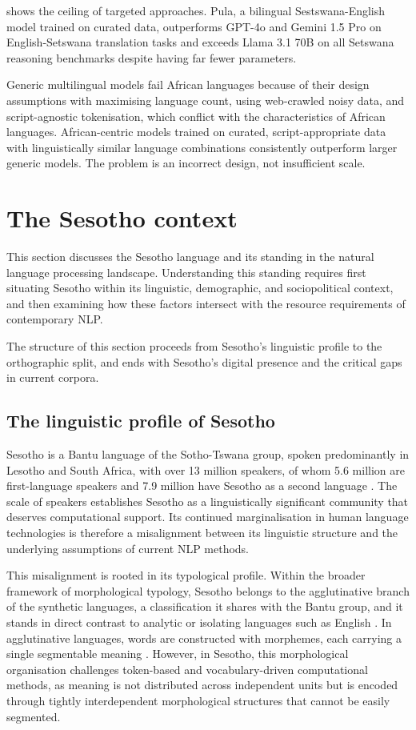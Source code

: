 \documentclass[11pt,a4paper]{article}
\begin{document}
\citet{brown2025pula} shows the ceiling of targeted approaches. Pula, a bilingual Sestswana-English model trained on curated data, outperforms GPT-4o and Gemini 1.5 Pro on English-Setswana translation tasks and exceeds Llama 3.1 70B on all Setswana reasoning benchmarks despite having far fewer parameters.

Generic multilingual models fail African languages because of their design assumptions with maximising language count, using web-crawled noisy data, and script-agnostic tokenisation, which conflict with the characteristics of African languages. African-centric models trained on curated, script-appropriate data with linguistically similar language combinations consistently outperform larger generic models. The problem is an incorrect design, not insufficient scale.

\clearpage
\section{The Sesotho context}
This section discusses the Sesotho language and its standing in the natural language processing landscape. Understanding this standing requires first situating Sesotho within its linguistic, demographic, and sociopolitical context, and then examining how these factors intersect with the resource requirements of contemporary NLP.

The structure of this section proceeds from Sesotho's linguistic profile to the orthographic split, and ends with Sesotho's digital presence and the critical gaps in current corpora.

\subsection{The linguistic profile of Sesotho}
Sesotho is a Bantu language of the Sotho-Tswana group, spoken predominantly in Lesotho and South Africa, with over 13 million speakers, of whom 5.6 million are first-language speakers and 7.9 million have Sesotho as a second language \citep{mokoaleli2020sesotho}. The scale of speakers establishes Sesotho as a linguistically significant community that deserves computational support. Its continued marginalisation in human language technologies is therefore a misalignment between its linguistic structure and the underlying assumptions of current NLP methods.

This misalignment is rooted in its typological profile. Within the broader framework of morphological typology, Sesotho belongs to the agglutinative branch of the synthetic languages, a classification it shares with the Bantu group, and it stands in direct contrast to analytic or isolating languages such as English \citep{kambarami2021out,masethe2022word}. In agglutinative languages, words are constructed with morphemes, each carrying a single segmentable meaning \citep{kambarami2021out}. However, in Sesotho, this morphological organisation challenges token-based and vocabulary-driven computational methods, as meaning is not distributed across independent units but is encoded through tightly interdependent morphological structures that cannot be easily segmented. 
\end{document}
